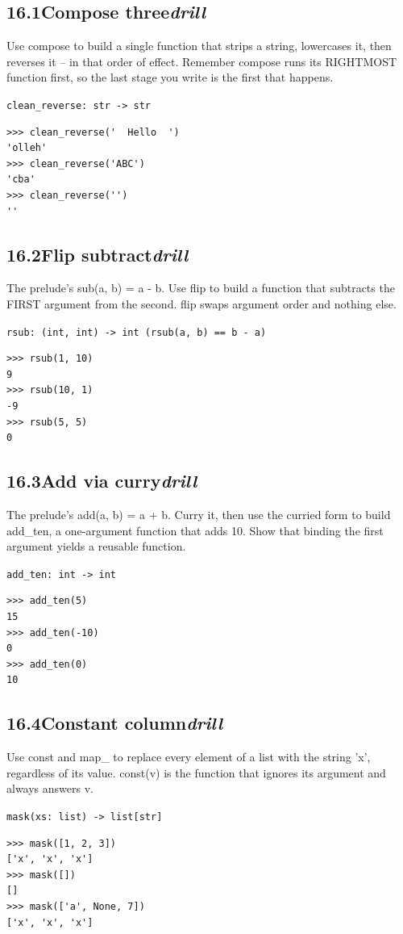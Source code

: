 \documentclass[10pt,letterpaper]{book}
\begin{document}
\subsection*{16.1\quad Compose three\hfill\textnormal{\textit{drill}}}
Use compose to build a single function that strips a string, lowercases it, then reverses it -- in that order of effect. Remember compose runs its RIGHTMOST function first, so the last stage you write is the first that happens.

\noindent\texttt{clean\_reverse: str -> str}
\begin{lstlisting}[style=ex]
>>> clean_reverse('  Hello  ')
'olleh'
>>> clean_reverse('ABC')
'cba'
>>> clean_reverse('')
''
\end{lstlisting}
\subsection*{16.2\quad Flip subtract\hfill\textnormal{\textit{drill}}}
The prelude's sub(a, b) = a - b. Use flip to build a function that subtracts the FIRST argument from the second. flip swaps argument order and nothing else.

\noindent\texttt{rsub: (int, int) -> int   (rsub(a, b) == b - a)}
\begin{lstlisting}[style=ex]
>>> rsub(1, 10)
9
>>> rsub(10, 1)
-9
>>> rsub(5, 5)
0
\end{lstlisting}
\subsection*{16.3\quad Add via curry\hfill\textnormal{\textit{drill}}}
The prelude's add(a, b) = a + b. Curry it, then use the curried form to build add\_ten, a one-argument function that adds 10. Show that binding the first argument yields a reusable function.

\noindent\texttt{add\_ten: int -> int}
\begin{lstlisting}[style=ex]
>>> add_ten(5)
15
>>> add_ten(-10)
0
>>> add_ten(0)
10
\end{lstlisting}
\subsection*{16.4\quad Constant column\hfill\textnormal{\textit{drill}}}
Use const and map\_ to replace every element of a list with the string 'x', regardless of its value. const(v) is the function that ignores its argument and always answers v.

\noindent\texttt{mask(xs: list) -> list[str]}
\begin{lstlisting}[style=ex]
>>> mask([1, 2, 3])
['x', 'x', 'x']
>>> mask([])
[]
>>> mask(['a', None, 7])
['x', 'x', 'x']
\end{lstlisting}
\end{document}
